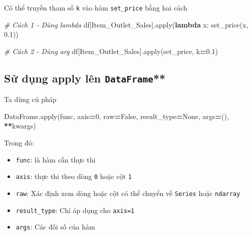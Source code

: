 \documentclass[
]{book}
\newenvironment{Shaded}{\begin{snugshade}}{\end{snugshade}}
\newcommand{\BuiltInTok}[1]{#1}
\newcommand{\CommentTok}[1]{\textcolor[rgb]{0.56,0.35,0.01}{\textit{#1}}}
\newcommand{\DecValTok}[1]{\textcolor[rgb]{0.00,0.00,0.81}{#1}}
\newcommand{\FloatTok}[1]{\textcolor[rgb]{0.00,0.00,0.81}{#1}}
\newcommand{\KeywordTok}[1]{\textcolor[rgb]{0.13,0.29,0.53}{\textbf{#1}}}
\newcommand{\NormalTok}[1]{#1}
\newcommand{\OperatorTok}[1]{\textcolor[rgb]{0.81,0.36,0.00}{\textbf{#1}}}
\newcommand{\StringTok}[1]{\textcolor[rgb]{0.31,0.60,0.02}{#1}}
\newcommand{\VariableTok}[1]{\textcolor[rgb]{0.00,0.00,0.00}{#1}}
\begin{document}
Có thể truyền tham số \texttt{k} vào hàm \texttt{set\_price} bằng hai cách

\begin{Shaded}
\begin{Highlighting}[]
\CommentTok{\# Cách 1 {-} Dùng lambda}
\NormalTok{df[}\StringTok{\textquotesingle{}Item\_Outlet\_Sales\textquotesingle{}}\NormalTok{].}\BuiltInTok{apply}\NormalTok{(}\KeywordTok{lambda}\NormalTok{ x: set\_price(x, }\FloatTok{0.1}\NormalTok{))}

\CommentTok{\# Cách 2 {-} Dùng \textasciigrave{}arg\textasciigrave{}}
\NormalTok{df[}\StringTok{\textquotesingle{}Item\_Outlet\_Sales\textquotesingle{}}\NormalTok{].}\BuiltInTok{apply}\NormalTok{(set\_price, k}\OperatorTok{=}\FloatTok{0.1}\NormalTok{)}
\end{Highlighting}
\end{Shaded}

\subsection{\texorpdfstring{Sử dụng apply lên \texttt{DataFrame}**}{Sử dụng apply lên DataFrame**}}\label{sux1eed-dux1ee5ng-apply-luxean-dataframe}

Ta dùng cú pháp

\begin{Shaded}
\begin{Highlighting}[]
\NormalTok{DataFrame.}\BuiltInTok{apply}\NormalTok{(func, axis}\OperatorTok{=}\DecValTok{0}\NormalTok{, raw}\OperatorTok{=}\VariableTok{False}\NormalTok{, result\_type}\OperatorTok{=}\VariableTok{None}\NormalTok{, args}\OperatorTok{=}\NormalTok{(), }\OperatorTok{**}\NormalTok{kwargs)}
\end{Highlighting}
\end{Shaded}

Trong đó:

\begin{itemize}
\item
  \texttt{func}: là hàm cần thực thi
\item
  \texttt{axis}: thực thi theo dòng \texttt{0} hoặc cột \texttt{1}
\item
  \texttt{raw}: Xác định xem dòng hoặc cột có thể chuyển về \texttt{Series} hoặc \texttt{ndarray}
\item
  \texttt{result\_type}: Chỉ áp dụng cho \texttt{axis=1}
\item
  \texttt{args}: Các đối số của hàm
\end{itemize}
\end{document}
